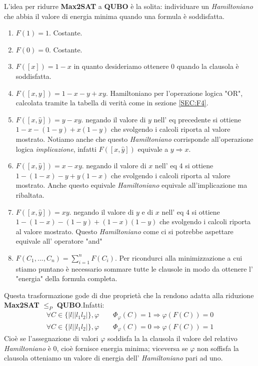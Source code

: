 \documentclass[a4paper]{article}
\begin{document}
L'idea per ridurre \textbf{Max2SAT} a \textbf{QUBO} è la solita: individuare un \textit{Hamiltoniano} che abbia il valore di energia minima quando una formula è soddisfatta.
\begin{enumerate}
	\item $F(1)=1$. Costante. 
	\item $F(0)=0$. Costante. 
	\item $F([x])=1-x$ in quanto desideriamo ottenere 0 quando la clausola è soddisfatta.
	\item $F([x,y])= 1-x-y +xy$. Hamiltoniano per l'operazione logica "OR", calcolata tramite la tabella di verità come in sezione \ref{SEC:F4}.
	\item $F([x,\hat y])= y - xy$. negando il valore di $y$ nell' eq precedente si ottiene $1-x-(1-y)+x(1-y)$ che svolgendo i calcoli riporta al valore mostrato.
		Notiamo anche che questo \textit{Hamiltoniano} corrisponde all'operazione logica \textit{implicazione}, infatti $F([x,\hat y])$ equivale a $ y \Rightarrow x$.
	\item $F([x,\hat y])= x - xy$. negando il valore di $x$ nell' eq 4 si ottiene $1-(1-x)-y+y(1-x)$ che svolgendo i calcoli riporta al valore mostrato.
		Anche questo equivale \textit{Hamiltoniano} equivale all'implicazione ma ribaltata.
	\item $F([x,\hat y])= xy$. negando il valore di $y$ e di $x$ nell' eq 4 si ottiene $1-(1-x)-(1-y)+(1-x)(1-y)$ che svolgendo i calcoli riporta al valore mostrato.
		Questo \textit{Hamiltoniano} come ci si potrebbe aspettare equivale all' operatore "and"
	\item $F(C_1,...,C_n) = \sum_{i=1}^n F(C_i)$. Per ricondurci alla minimizzazione a cui stiamo puntano è necessario sommare tutte le clausole in modo da ottenere l' "energia" della formula completa.
\end{enumerate}
Questa trasformazione gode di due proprietà che la rendono adatta alla riduzione \textbf{Max2SAT} $\leq_P$ \textbf{QUBO}.Infatti:
\begin{align*}
\forall C \in \{\lvert l \rvert \lvert l_1 l_2 \rvert\}, \varphi \qquad \Phi_{\varphi}(C) = 1 \Rightarrow \varphi(F(C)) = 0 \\ 
\forall C \in \{\lvert l \rvert \lvert l_1 l_2 \rvert\}, \varphi \qquad \Phi_{\varphi}(C) = 0 \Rightarrow \varphi(F(C)) = 1 
\end{align*}
Cioè se l'assegnazione di valori $\varphi$ soddisfa la la clausola il valore del relativo \textit{Hamiltoniano} è $0$, cioè fornisce energia minima; viceversa se $\varphi$ non soffisfa la clausola otteniamo un valore di energia dell' \textit{Hamiltoniano} pari ad uno.
\end{document}

